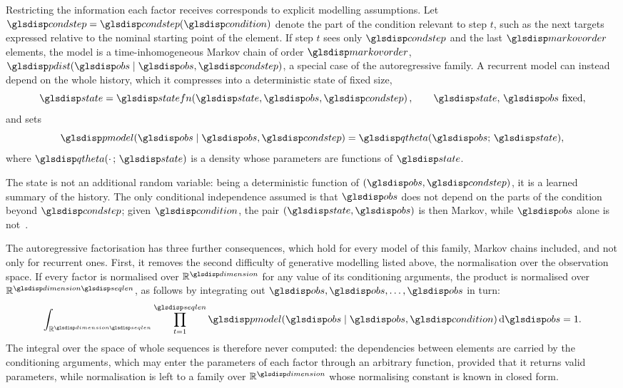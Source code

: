 \documentclass[12pt]{report}
\begin{document}
Restricting the information each factor receives corresponds to explicit modelling assumptions. Let $\sym{condstep}_t = \sym{condstep}_t(\sym{condition})$ denote the part of the condition relevant to step $t$, such as the next targets expressed relative to the nominal starting point of the element. If step $t$ sees only $\sym{condstep}_t$ and the last $\sym{markovorder}$ elements, the model is a time-inhomogeneous Markov chain of order $\sym{markovorder}$, $\sym{pdist}(\sym{obs}_t \mid \sym{obs}_{t-\sym*{markovorder}:t-1}, \sym{condstep}_t)$, a special case of the autoregressive family. A recurrent model can instead depend on the whole history, which it compresses into a deterministic state of fixed size,
\begin{equation}
    \sym{state}_t = \sym{statefn}\!\left(\sym{state}_{t-1}, \sym{obs}_{t-1}, \sym{condstep}_t\right), \qquad \sym{state}_0,\, \sym{obs}_0 \text{ fixed},
    \label{eq:recurrent_state}
\end{equation}
and sets
\begin{equation}
    \sym{pmodel}(\sym{obs}_t \mid \sym{obs}_{<t}, \sym{condstep}_{1:t}) = \sym{qtheta}(\sym{obs}_t;\, \sym{state}_t),
\end{equation}
where $\sym{qtheta}(\cdot\,;\, \sym{state})$ is a density whose parameters are functions of $\sym{state}$.

The state is not an additional random variable: being a deterministic function of $(\sym{obs}_{<t}, \sym{condstep}_{1:t})$, it is a learned summary of the history. The only conditional independence assumed is that $\sym{obs}_t$ does not depend on the parts of the condition beyond $\sym{condstep}_{1:t}$; given $\sym{condition}$, the pair $(\sym{state}_t, \sym{obs}_t)$ is then Markov, while $\sym{obs}_t$ alone is not~\cite[ch.~10]{goodfellow2016deep}.

The autoregressive factorisation has three further consequences, which hold for every model of this family, Markov chains included, and not only for recurrent ones. First, it removes the second difficulty of generative modelling listed above, the normalisation over the observation space. If every factor is normalised over $\mathbb{R}^{\sym{dimension}}$ for any value of its conditioning arguments, the product is normalised over $\mathbb{R}^{\sym{dimension}\sym{seqlen}}$, as follows by integrating out $\sym{obs}_{\sym*{seqlen}}, \sym{obs}_{\sym*{seqlen}-1}, \dots, \sym{obs}_1$ in turn:
\begin{equation}
    \int_{\mathbb{R}^{\sym{dimension}\sym{seqlen}}} \prod_{t=1}^{\sym{seqlen}} \sym{pmodel}(\sym{obs}_t \mid \sym{obs}_{<t}, \sym{condition})\, \mathrm{d}\sym{obs}_{1:\sym*{seqlen}} = 1 .
\end{equation}
The integral over the space of whole sequences is therefore never computed: the dependencies between elements are carried by the conditioning arguments, which may enter the parameters of each factor through an arbitrary function, provided that it returns valid parameters, while normalisation is left to a family over $\mathbb{R}^{\sym{dimension}}$ whose normalising constant is known in closed form.
\end{document}

